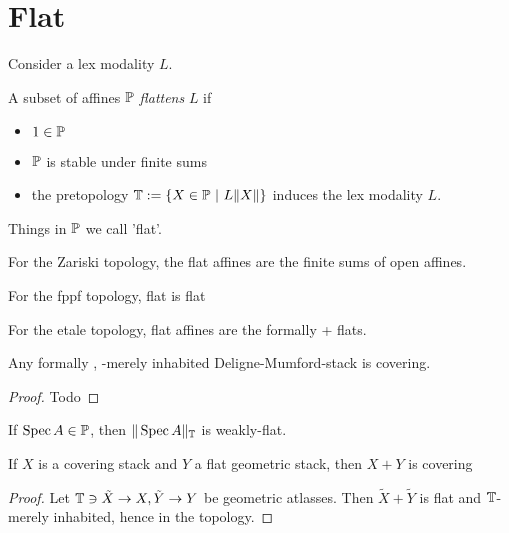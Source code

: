 \section{Flat}
Consider a lex modality $L$.
\begin{definition}
	A subset of affines $\mathbb{P}$ \emph{flattens} $L$ if
	\begin{itemize}
		\item $1 \in \mathbb{P}$
		\item $\mathbb{P}$ is stable under finite sums
		\item 	 the pretopology $\bT := \{ X \in \bP \ | \ L \| X \| \}$ induces the lex modality $L$.
	\end{itemize}
	
\end{definition}

Things in $\mathbb{P}$ we call 'flat'.
\begin{example}
	For the Zariski topology, the flat affines are the finite sums of open affines.
\end{example}
\begin{example}
	For the fppf topology, flat is flat
\end{example}
\begin{example}
	For the etale topology, flat affines are the formally \etale + flats.
\end{example}
\begin{lemma}{\label{lemma:coveringDMstacks}}
	Any formally \etale, \etale-merely inhabited Deligne-Mumford-stack is covering.
\end{lemma}
\begin{proof}
	Todo
\end{proof}
\begin{lemma}
	If $\operatorname{Spec} A \in \mathbb{P}$, then $\| \operatorname{Spec} A\|_{\mathbb{T}}$ is weakly-flat.
\end{lemma}
\begin{lemma}
	If $X$ is a covering stack and $Y$ a flat geometric stack, then $X + Y$ is covering
\end{lemma}
\begin{proof}
	Let $\mathbb{T} \ni \tilde X \to X, \tilde Y \to Y$ be geometric atlasses. Then $\tilde X+ \tilde Y$ is flat and $\mathbb{T}$-merely inhabited, hence in the topology.
\end{proof}


